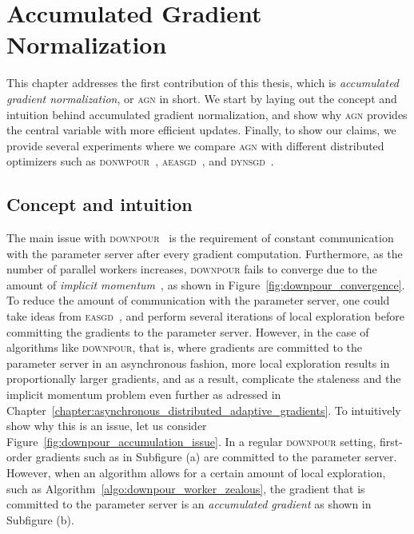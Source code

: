 %
%
%

\chapter{Accumulated Gradient Normalization}
\label{chapter:accumulated_gradient_normalization}

This chapter addresses the first contribution of this thesis, which is \emph{accumulated gradient normalization}, or \textsc{agn} in short. We start by laying out the concept and intuition behind accumulated gradient normalization, and show why \textsc{agn} provides the central variable with more efficient updates. Finally, to show our claims, we provide several experiments where we compare \textsc{agn} with different distributed optimizers such as \textsc{donwpour}~\cite{dean2012large}, \textsc{aeasgd}~\cite{zhang2015deep}, and \textsc{dynsgd}~\cite{jiang2017heterogeneity}.

\section{Concept and intuition}
\label{sec:agn_concept}

The main issue with \textsc{downpour}~\cite{dean2012large} is the requirement of constant communication with the parameter server after every gradient computation. Furthermore, as the number of parallel workers increases, \textsc{downpour} fails to converge due to the amount of \emph{implicit momentum}~\cite{implicitmomentum}, as shown in Figure~\ref{fig:downpour_convergence}. To reduce the amount of communication with the parameter server, one could take ideas from \textsc{easgd}~\cite{zhang2015deep}, and perform several iterations of local exploration before committing the gradients to the parameter server. However, in the case of algorithms like \textsc{downpour}, that is, where gradients are committed to the parameter server in an asynchronous fashion, more local exploration results in proportionally larger gradients, and as a result, complicate the staleness and the implicit momentum problem even further as adressed in Chapter~\ref{chapter:asynchronous_distributed_adaptive_gradients}. To intuitively show why this is an issue, let us consider Figure~\ref{fig:downpour_accumulation_issue}. In a regular \textsc{downpour} setting, first-order gradients such as in Subfigure (a) are committed to the parameter server. However, when an algorithm allows for a certain amount of local exploration, such as Algorithm~\ref{algo:downpour_worker_zealous}, the gradient that is committed to the parameter server is an \emph{accumulated gradient} as shown in Subfigure (b).

